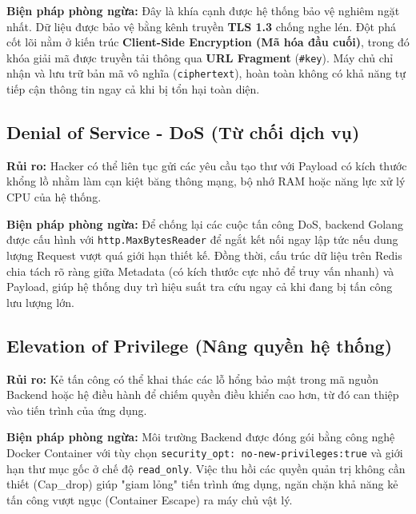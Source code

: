 \textbf{Biện pháp phòng ngừa:} Đây là khía cạnh được hệ thống bảo vệ nghiêm ngặt nhất. Dữ liệu được bảo vệ bằng kênh truyền \textbf{TLS 1.3} chống nghe lén. Đột phá cốt lõi nằm ở kiến trúc \textbf{Client-Side Encryption (Mã hóa đầu cuối)}, trong đó khóa giải mã được truyền tải thông qua \textbf{URL Fragment} (\texttt{\#key}). Máy chủ chỉ nhận và lưu trữ bản mã vô nghĩa (\texttt{ciphertext}), hoàn toàn không có khả năng tự tiếp cận thông tin ngay cả khi bị tổn hại toàn diện.

\subsection{Denial of Service - DoS (Từ chối dịch vụ)}

\textbf{Rủi ro:} Hacker có thể liên tục gửi các yêu cầu tạo thư với Payload có kích thước khổng lồ nhằm làm cạn kiệt băng thông mạng, bộ nhớ RAM hoặc năng lực xử lý CPU của hệ thống.

\textbf{Biện pháp phòng ngừa:} Để chống lại các cuộc tấn công DoS, backend Golang được cấu hình với \texttt{http.MaxBytesReader} để ngắt kết nối ngay lập tức nếu dung lượng Request vượt quá giới hạn thiết kế. Đồng thời, cấu trúc dữ liệu trên Redis chia tách rõ ràng giữa Metadata (có kích thước cực nhỏ để truy vấn nhanh) và Payload, giúp hệ thống duy trì hiệu suất tra cứu ngay cả khi đang bị tấn công lưu lượng lớn.

\subsection{Elevation of Privilege (Nâng quyền hệ thống)}

\textbf{Rủi ro:} Kẻ tấn công có thể khai thác các lỗ hổng bảo mật trong mã nguồn Backend hoặc hệ điều hành để chiếm quyền điều khiển cao hơn, từ đó can thiệp vào tiến trình của ứng dụng.

\textbf{Biện pháp phòng ngừa:} Môi trường Backend được đóng gói bằng công nghệ Docker Container với tùy chọn \texttt{security\_opt: no-new-privileges:true} và giới hạn thư mục gốc ở chế độ \texttt{read\_only}. Việc thu hồi các quyền quản trị không cần thiết (Cap\_drop) giúp "giam lỏng" tiến trình ứng dụng, ngăn chặn khả năng kẻ tấn công vượt ngục (Container Escape) ra máy chủ vật lý.